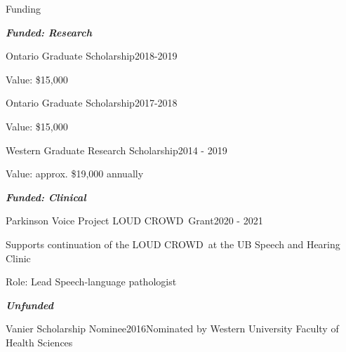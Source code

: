 \documentclass{resume} %
\begin{document}
\begin{rSection}{Funding}


\begin{center}
	{\bf \emph{Funded: Research}}
\end{center}


\begin{rSubsection}{Ontario Graduate Scholarship}{2018-2019}{}{}
	\item Value: \$15,000
\end{rSubsection}

\begin{rSubsection}{Ontario Graduate Scholarship}{2017-2018}{}{}
	\item Value: \$15,000
\end{rSubsection}

\begin{rSubsection}{Western Graduate Research Scholarship}{2014 - 2019}{}{} %
	\item Value: approx. \$19,000 annually
\end{rSubsection}

\begin{center}
	{\bf \emph{Funded: Clinical}}
\end{center}

\begin{rSubsection}{Parkinson Voice Project LOUD CROWD\textregistered \ Grant}{2020 - 2021}{}{} %
	\item Supports continuation of the LOUD CROWD\textregistered \ at the UB Speech and Hearing Clinic
	\item Role: Lead Speech-language pathologist
\end{rSubsection}

\begin{center}
	{\bf \emph{Unfunded}}
\end{center}



\begin{rSubsection}{Vanier Scholarship Nominee}{2016}{Nominated by Western University Faculty of Health Sciences}{}
\end{rSubsection}

\end{rSection}
\end{document}
